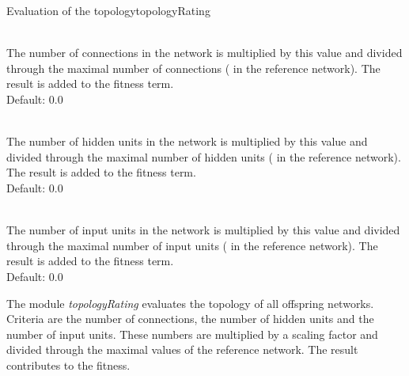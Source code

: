 \begin{moduledoc}{Evaluation of the topology}{topologyRating}

\item[\KeyWord{weightRating} \optParam{f}]~\\
The number of connections in the network is multiplied by this value and
divided through  the maximal number of connections ( in the reference network).
The result is added
to the fitness term.\\
Default: 0.0

\item[\KeyWord{unitRating} \optParam{u}]~\\  
The number of hidden units in the network is multiplied by this value and
divided through  the maximal number of hidden units ( in the reference network).
The result is added
to the fitness term.\\
Default: 0.0

\item[\KeyWord{inputRating} \optParam{k}]~\\ 
The number of input units in the network is multiplied by this value and
divided through  the maximal number of input units ( in the reference network).
The result is added
to the fitness term.\\
Default: 0.0

\end{moduledoc}



The module {\it topologyRating} evaluates the topology of all
offspring networks. Criteria are the number of connections,
the number of hidden units and the number of input units.
These numbers are multiplied by a scaling factor and divided through
the maximal values of the reference network. The result contributes
to the fitness.






